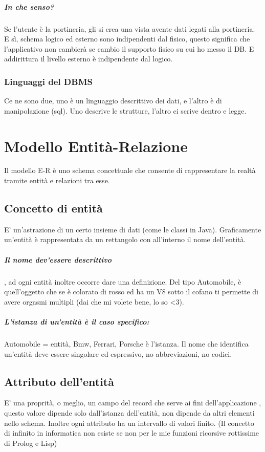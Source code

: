 \documentclass[12pt, a4paper, openany, twoside]{book}
\begin{document}
\paragraph{In che senso?} Se l'utente è la portineria, gli si crea una vista
avente dati legati alla portineria.
E sì, schema logico ed esterno sono indipendenti dal fisico, questo significa
che l'applicativo non cambierà se cambio il supporto fisico su cui ho messo il
DB. E addirittura il livello esterno è indipendente dal logico.
\subsection{Linguaggi del DBMS}
Ce ne sono due, uno è un linguaggio descrittivo dei dati, e l'altro è di 
manipolazione (sql). Uno descrive le strutture, l'altro ci scrive dentro e 
legge.
\chapter{Modello Entità-Relazione}
Il modello E-R è uno schema concettuale che consente di rappresentare la 
realtà tramite entità e relazioni tra esse.
\section{Concetto di entità}
E' un'astrazione di un certo insieme di dati (come le classi in Java). Graficamente
un'entità è rappresentata da un rettangolo con all'interno il nome dell'entità.
\paragraph{Il nome dev'essere descrittivo},
ad ogni entità inoltre occorre dare una definizione. Del tipo Automobile, è 
quell'oggetto che se è colorato di rosso ed ha un V8 sotto il cofano ti permette
di avere orgasmi multipli (dai che mi volete bene, lo so <3).
\paragraph{L'istanza di un'entità è il caso specifico:} Automobile = entità, 
Bmw, Ferrari, Porsche è l'istanza. Il nome che identifica un'entità deve essere
singolare ed espressivo, no abbreviazioni, no codici.
\section{Attributo dell'entità}
E' una proprità, o meglio, un campo del record che serve ai fini dell'applicazione
, questo valore dipende solo dall'istanza dell'entità, non dipende da altri
elementi nello schema. Inoltre ogni attributo ha un intervallo di valori finito.
(Il concetto di infinito in informatica non esiste se non per le mie funzioni
ricorsive rottissime di Prolog e Lisp) 
\end{document}

